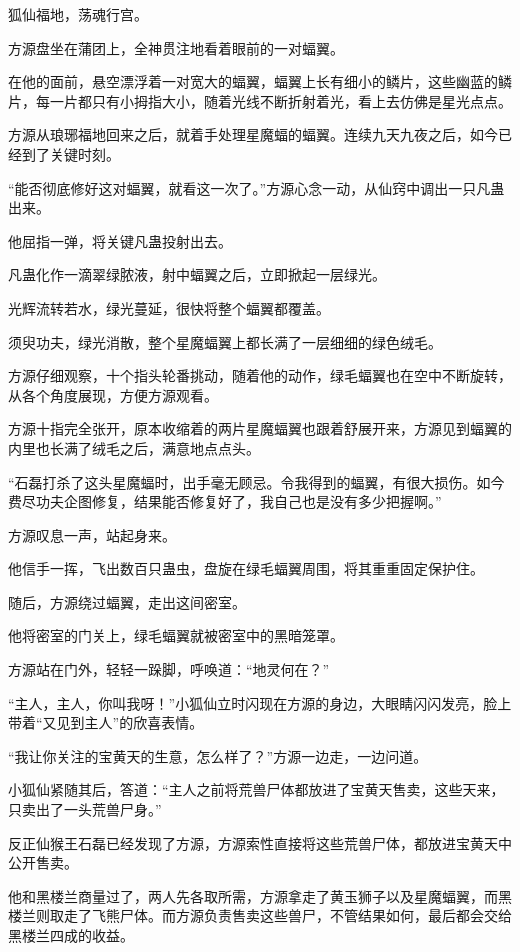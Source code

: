 
\begin{this_body}

狐仙福地，荡魂行宫。

方源盘坐在蒲团上，全神贯注地看着眼前的一对蝠翼。

在他的面前，悬空漂浮着一对宽大的蝠翼，蝠翼上长有细小的鳞片，这些幽蓝的鳞片，每一片都只有小拇指大小，随着光线不断折射着光，看上去仿佛是星光点点。

方源从琅琊福地回来之后，就着手处理星魔蝠的蝠翼。连续九天九夜之后，如今已经到了关键时刻。

“能否彻底修好这对蝠翼，就看这一次了。”方源心念一动，从仙窍中调出一只凡蛊出来。

他屈指一弹，将关键凡蛊投射出去。

凡蛊化作一滴翠绿脓液，射中蝠翼之后，立即掀起一层绿光。

光辉流转若水，绿光蔓延，很快将整个蝠翼都覆盖。

须臾功夫，绿光消散，整个星魔蝠翼上都长满了一层细细的绿色绒毛。

方源仔细观察，十个指头轮番挑动，随着他的动作，绿毛蝠翼也在空中不断旋转，从各个角度展现，方便方源观看。

方源十指完全张开，原本收缩着的两片星魔蝠翼也跟着舒展开来，方源见到蝠翼的内里也长满了绒毛之后，满意地点点头。

“石磊打杀了这头星魔蝠时，出手毫无顾忌。令我得到的蝠翼，有很大损伤。如今费尽功夫企图修复，结果能否修复好了，我自己也是没有多少把握啊。”

方源叹息一声，站起身来。

他信手一挥，飞出数百只蛊虫，盘旋在绿毛蝠翼周围，将其重重固定保护住。

随后，方源绕过蝠翼，走出这间密室。

他将密室的门关上，绿毛蝠翼就被密室中的黑暗笼罩。

方源站在门外，轻轻一跺脚，呼唤道：“地灵何在？”

“主人，主人，你叫我呀！”小狐仙立时闪现在方源的身边，大眼睛闪闪发亮，脸上带着“又见到主人”的欣喜表情。

“我让你关注的宝黄天的生意，怎么样了？”方源一边走，一边问道。

小狐仙紧随其后，答道：“主人之前将荒兽尸体都放进了宝黄天售卖，这些天来，只卖出了一头荒兽尸身。”

反正仙猴王石磊已经发现了方源，方源索性直接将这些荒兽尸体，都放进宝黄天中公开售卖。

他和黑楼兰商量过了，两人先各取所需，方源拿走了黄玉狮子以及星魔蝠翼，而黑楼兰则取走了飞熊尸体。而方源负责售卖这些兽尸，不管结果如何，最后都会交给黑楼兰四成的收益。


\end{this_body}
